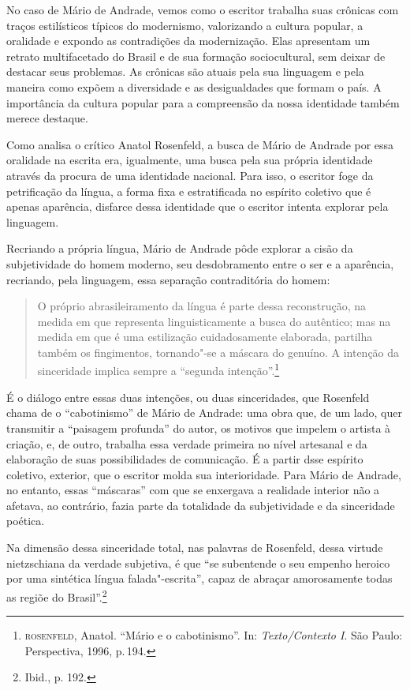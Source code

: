 No caso de Mário de Andrade, vemos como o escritor trabalha suas crônicas com traços estilísticos típicos do modernismo, 
valorizando a cultura popular, a oralidade e
expondo as contradições da modernização. Elas apresentam um retrato
multifacetado do Brasil e de sua formação sociocultural, sem deixar de
destacar seus problemas. As crônicas são atuais pela sua linguagem e pela
maneira como expõem a diversidade e as desigualdades que formam o país.
A importância da cultura popular para a compreensão da nossa identidade
também merece destaque.

Como analisa o crítico Anatol Rosenfeld, a busca de Mário de Andrade por essa oralidade na escrita era, igualmente, uma busca pela sua própria identidade através da procura de uma identidade nacional. Para isso, o escritor foge da petrificação da língua, a forma fixa e estratificada no espírito coletivo que é apenas aparência, disfarce dessa identidade que o escritor intenta explorar pela linguagem.

Recriando a própria língua, Mário de Andrade
pôde explorar a cisão da subjetividade do homem moderno, seu desdobramento entre o ser e a aparência, recriando, pela linguagem, essa separação contraditória do homem:

\begin{quote}
O próprio abrasileiramento da língua é parte dessa reconstrução, na medida em que representa linguisticamente a busca do autêntico; mas na medida em que é uma estilização cuidadosamente elaborada, partilha também os fingimentos, tornando"-se a máscara do genuíno. A intenção da sinceridade implica sempre a ``segunda intenção''.\footnote{\textsc{rosenfeld}, Anatol. ``Mário e o cabotinismo''. In: \textit{Texto/Contexto I}. São Paulo: Perspectiva, 1996, p.\,194.}
\end{quote}

É o diálogo entre essas duas intenções, ou duas sinceridades, que Rosenfeld chama de o ``cabotinismo'' de Mário de Andrade: uma obra que, de um lado, quer transmitir a ``paisagem profunda'' do autor, os motivos que impelem o artista à criação, e, de outro, trabalha essa verdade primeira no nível artesanal e da elaboração de suas possibilidades de comunicação. É a partir dsse espírito coletivo, exterior,
que o escritor molda sua interioridade. Para Mário de Andrade, no entanto, essas ``máscaras'' com que se enxergava a realidade interior não a afetava, ao contrário, fazia parte da totalidade da subjetividade e da sinceridade poética.

Na dimensão dessa sinceridade total, nas palavras de Rosenfeld, dessa virtude nietzschiana da verdade subjetiva, é que ``se subentende o seu empenho heroico por uma sintética língua falada"-escrita'', capaz de abraçar amorosamente todas as regiõe do Brasil''.\footnote{Ibid., p. 192.}

